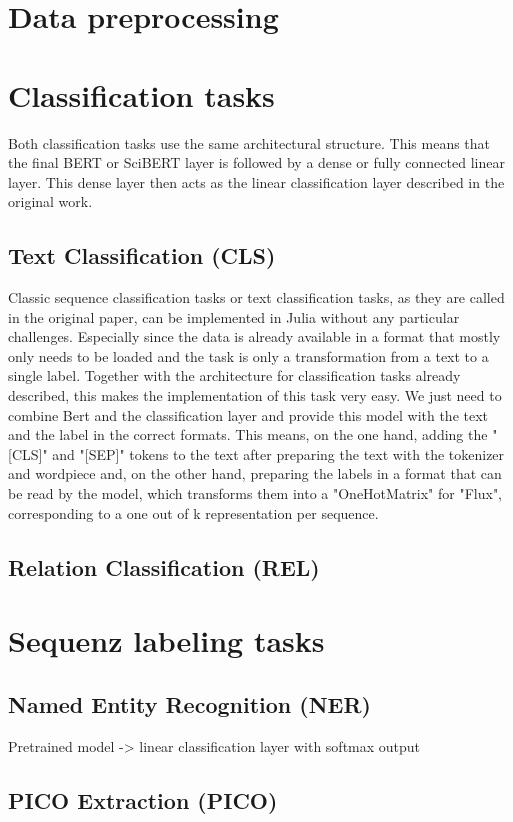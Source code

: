 \section{Data preprocessing}
\color{black}

\section{Classification tasks}
Both classification tasks use the same architectural structure. This means that the final BERT or SciBERT layer is followed by a dense or fully connected linear layer. This dense layer then acts as the linear classification layer described in the original work. 
\subsection{Text Classification (CLS)}
Classic sequence classification tasks or text classification tasks, as they are called in the original paper, can be implemented in Julia without any particular challenges. Especially since the data is already available in a format that mostly only needs to be loaded and the task is only a transformation from a text to a single label. Together with the architecture for classification tasks already described, this makes the implementation of this task very easy. We just need to combine Bert and the classification layer and provide this model with the text and the label in the correct formats. This means, on the one hand, adding the "[CLS]" and "[SEP]" tokens to the text after preparing the text with the tokenizer and wordpiece and, on the other hand, preparing the labels in a format that can be read by the model, which transforms them into a "OneHotMatrix" for "Flux", corresponding to a one out of k representation per sequence.
\subsection{Relation Classification (REL)}

\section{Sequenz labeling tasks}
\subsection{Named Entity Recognition (NER)}
\color{ForestGreen}
Pretrained model -> linear classification layer with softmax output
\color{black}
\subsection{PICO Extraction (PICO)}

